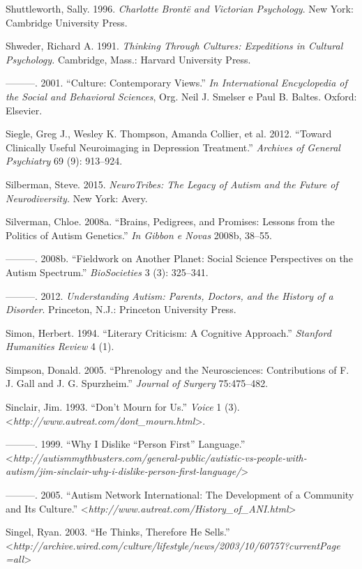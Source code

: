 Shuttleworth, Sally. 1996. \emph{Charlotte Brontë and Victorian
Psychology}. New York: Cambridge University Press.

Shweder, Richard A. 1991. \emph{Thinking Through Cultures: Expeditions
in Cultural Psychology.} Cambridge, Mass.: Harvard University Press.

---------. 2001. ``Culture: Contemporary Views.'' \emph{In International
Encyclopedia of the Social and Behavioral Sciences}, Org. Neil J.
Smelser e Paul B. Baltes. Oxford: Elsevier.

Siegle, Greg J., Wesley K. Thompson, Amanda Collier, et al. 2012.
``Toward Clinically Useful Neuroimaging in Depression Treatment.''
\emph{Archives of General Psychiatry} 69 (9): 913--924.

Silberman, Steve. 2015. \emph{NeuroTribes: The Legacy of Autism and the
Future of Neurodiversity.} New York: Avery.

Silverman, Chloe. 2008a. ``Brains, Pedigrees, and Promises: Lessons from
the Politics of Autism Genetics.'' \emph{In Gibbon e Novas} 2008b,
38--55.

---------. 2008b. ``Fieldwork on Another Planet: Social Science
Perspectives on the Autism Spectrum.'' \emph{BioSocieties} 3 (3):
325--341.

---------. 2012. \emph{Understanding Autism: Parents, Doctors, and the
History of a Disorder}. Princeton, N.J.: Princeton University Press.

Simon, Herbert. 1994. ``Literary Criticism: A Cognitive Approach.''
\emph{Stanford Humanities Review} 4 (1).

Simpson, Donald. 2005. ``Phrenology and the Neurosciences: Contributions
of F. J. Gall and J. G. Spurzheim.'' \emph{ Journal of Surgery}
75:475--482.

Sinclair, Jim. 1993. ``Don't Mourn for Us.'' \emph{Voice} 1 (3).
\textless{}\emph{http://www.autreat.com/dont\_mourn.html}\textgreater{}.

---------. 1999. ``Why I Dislike ``Person First'' Language.''
\textless{}\emph{http://autismmythbusters.com/general-public/autistic-vs-people-with-autism/jim-sinclair-why-i-dislike-person-first-language/}\textgreater{}

---------. 2005. ``Autism Network International: The Development of a
Community and Its Culture.''
\textless{}\emph{http://www.autreat.com/History\_of\_ANI.html}\textgreater{}

Singel, Ryan. 2003. ``He Thinks, Therefore He Sells.''
\textless{}\emph{http://archive.wired.com/culture/lifestyle/news/2003/10/60757?currentPage​=all}\textgreater{}

